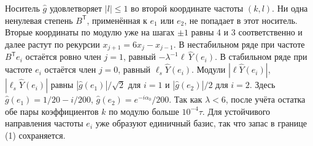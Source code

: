 \documentclass[11pt,a4paper]{article}
\begin{document}
Носитель \(\widehat g\) удовлетворяет \(|l|\le1\) во второй координате частоты \((k,l)\). Ни одна ненулевая степень \(B^{\mathsf T}\), применённая к \(e_1\) или \(e_2\), не попадает в этот носитель. Вторые координаты по модулю уже на шагах \(\pm1\) равны 4 и 3 соответственно и далее растут по рекурсии \(x_{j+1}=6x_j-x_{j-1}\).
В нестабильном ряде при частоте \(B^{\mathsf T}e_i\) остаётся ровно член \(j=1\), равный \(-\lambda^{-1}\ell\,\widehat Y(e_i)\). В стабильном ряде при частоте \(e_i\) остаётся член \(j=0\), равный \(\ell_s \widehat Y(e_i)\). Модули \(|\ell\widehat Y(e_i)|\), \(|\ell_s\widehat Y(e_i)|\) равны \(|\widehat g(e_1)|/\sqrt2\) для \(i=1\) и \(|\widehat g(e_2)|/2\) для \(i=2\). Здесь \(\widehat g(e_1)=1/20-i/200\), \(\widehat g(e_2)=e^{-i\alpha_0}/200\). Так как \(\lambda<6\), после учёта остатка обе пары коэффициентов \(k\) по модулю больше \(10^{-4}\tau\). Для устойчивого направления частоты \(e_i\) уже образуют единичный базис, так что запас в границе (1) сохраняется.
\end{document}
